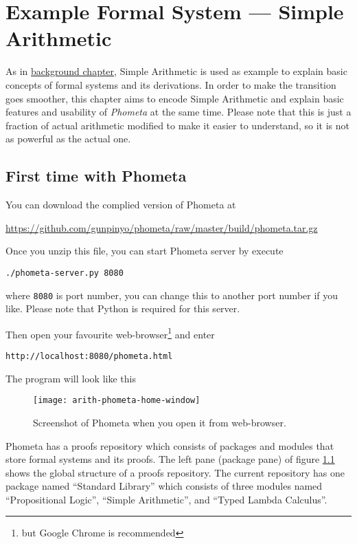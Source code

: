 \documentclass[master.tex]{subfiles}
\begin{document}
\chapter{Example Formal System --- Simple Arithmetic}
\label{chap:example_simple_arithmetic}

As in \hyperref[chap:background]{background chapter}, Simple Arithmetic is
used as example to explain basic concepts of formal systems and its derivations.
In order to make the transition goes smoother, this chapter aims to encode
Simple Arithmetic and explain basic features and usability of \emph{Phometa} at
the same time. Please note that this is just a fraction of
actual arithmetic modified to make it easier to understand, so it is not as
powerful as the actual one.

\section{First time with Phometa}

You can download the complied version of Phometa at

{\centering\url{https://github.com/gunpinyo/phometa/raw/master/build/phometa.tar.gz}}

Once you unzip this file, you can start Phometa server by execute

\texttt{./phometa-server.py 8080}

where \texttt{8080} is port number, you can change this to another port number
if you like. Please note that Python is required for this server.

Then open your favourite web-browser\footnote{but Google Chrome is recommended}
and enter

\texttt{http://localhost:8080/phometa.html}

The program will look like this

\begin{figure}[H]
    \centering
    \texttt{[image: arith-phometa-home-window]}
    \caption{Screenshot of Phometa when you open it from web-browser.}
\label{fig:arith-phometa-home-window}
\end{figure}

Phometa has a proofs repository which consists of packages and modules that
store formal systems and its proofs. The left pane (package pane) of figure
\ref{fig:arith-phometa-home-window} shows the global structure of a proofs
repository. The current repository has one package named ``Standard Library''
which consists of three modules named ``Propositional Logic'', ``Simple
Arithmetic'', and ``Typed Lambda Calculus''.
\end{document}
